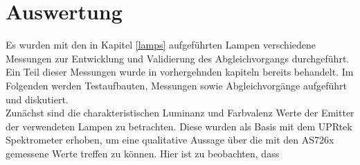 \documentclass[11pt]{scrartcl}
\begin{document}
\section{Auswertung}
Es wurden mit den in Kapitel \ref{lamps} aufgeführten Lampen verschiedene Messungen zur Entwicklung und Validierung des Abgleichvorgangs durchgeführt.\\
Ein Teil dieser Messungen wurde in vorhergehnden kapiteln bereits behandelt. Im Folgenden werden Testaufbauten, Messungen sowie Abgleichvorgänge aufgeführt
und diskutiert.\\
Zunächst sind die charakteristischen Luminanz und Farbvalenz Werte der Emitter der verwendeten Lampen zu betrachten. Diese wurden als Basis mit dem UPRtek
Spektrometer erhoben, um eine qualitative Aussage über die mit den AS726x gemessene Werte treffen zu können. Hier ist zu beobachten, dass
\end{document}
